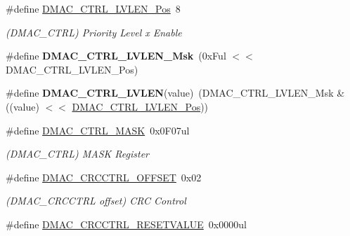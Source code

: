 \begin{DoxyCompactItemize}
\item 
\hypertarget{group___s_a_m_l21___d_m_a_c_gacf6ab23402d738038e9af069952aeeb4}{}\#define \hyperlink{group___s_a_m_l21___d_m_a_c_gacf6ab23402d738038e9af069952aeeb4}{D\+M\+A\+C\+\_\+\+C\+T\+R\+L\+\_\+\+L\+V\+L\+E\+N\+\_\+\+Pos}~8\label{group___s_a_m_l21___d_m_a_c_gacf6ab23402d738038e9af069952aeeb4}

\begin{DoxyCompactList}\small\item\em (D\+M\+A\+C\+\_\+\+C\+T\+R\+L) Priority Level x Enable \end{DoxyCompactList}\item 
\hypertarget{group___s_a_m_l21___d_m_a_c_ga62f5bd13bd662ba7d0a57fb3175edbbe}{}\#define {\bfseries D\+M\+A\+C\+\_\+\+C\+T\+R\+L\+\_\+\+L\+V\+L\+E\+N\+\_\+\+Msk}~(0x\+Ful $<$$<$ D\+M\+A\+C\+\_\+\+C\+T\+R\+L\+\_\+\+L\+V\+L\+E\+N\+\_\+\+Pos)\label{group___s_a_m_l21___d_m_a_c_ga62f5bd13bd662ba7d0a57fb3175edbbe}

\item 
\hypertarget{group___s_a_m_l21___d_m_a_c_gafee07ad1a444c37f127b6c537acd80b4}{}\#define {\bfseries D\+M\+A\+C\+\_\+\+C\+T\+R\+L\+\_\+\+L\+V\+L\+E\+N}(value)~(D\+M\+A\+C\+\_\+\+C\+T\+R\+L\+\_\+\+L\+V\+L\+E\+N\+\_\+\+Msk \& ((value) $<$$<$ \hyperlink{group___s_a_m_l21___d_m_a_c_gacf6ab23402d738038e9af069952aeeb4}{D\+M\+A\+C\+\_\+\+C\+T\+R\+L\+\_\+\+L\+V\+L\+E\+N\+\_\+\+Pos}))\label{group___s_a_m_l21___d_m_a_c_gafee07ad1a444c37f127b6c537acd80b4}

\item 
\hypertarget{group___s_a_m_l21___d_m_a_c_gad1d877edb95964f4ff5b8203fec99940}{}\#define \hyperlink{group___s_a_m_l21___d_m_a_c_gad1d877edb95964f4ff5b8203fec99940}{D\+M\+A\+C\+\_\+\+C\+T\+R\+L\+\_\+\+M\+A\+S\+K}~0x0\+F07ul\label{group___s_a_m_l21___d_m_a_c_gad1d877edb95964f4ff5b8203fec99940}

\begin{DoxyCompactList}\small\item\em (D\+M\+A\+C\+\_\+\+C\+T\+R\+L) M\+A\+S\+K Register \end{DoxyCompactList}\item 
\hypertarget{group___s_a_m_l21___d_m_a_c_ga0ba8bf167fc7c1dd35087cfd976477d2}{}\#define \hyperlink{group___s_a_m_l21___d_m_a_c_ga0ba8bf167fc7c1dd35087cfd976477d2}{D\+M\+A\+C\+\_\+\+C\+R\+C\+C\+T\+R\+L\+\_\+\+O\+F\+F\+S\+E\+T}~0x02\label{group___s_a_m_l21___d_m_a_c_ga0ba8bf167fc7c1dd35087cfd976477d2}

\begin{DoxyCompactList}\small\item\em (D\+M\+A\+C\+\_\+\+C\+R\+C\+C\+T\+R\+L offset) C\+R\+C Control \end{DoxyCompactList}\item 
\hypertarget{group___s_a_m_l21___d_m_a_c_gae543d44e42a68caa3678fecd8f4ce535}{}\#define \hyperlink{group___s_a_m_l21___d_m_a_c_gae543d44e42a68caa3678fecd8f4ce535}{D\+M\+A\+C\+\_\+\+C\+R\+C\+C\+T\+R\+L\+\_\+\+R\+E\+S\+E\+T\+V\+A\+L\+U\+E}~0x0000ul\label{group___s_a_m_l21___d_m_a_c_gae543d44e42a68caa3678fecd8f4ce535}


\end{DoxyCompactItemize}
